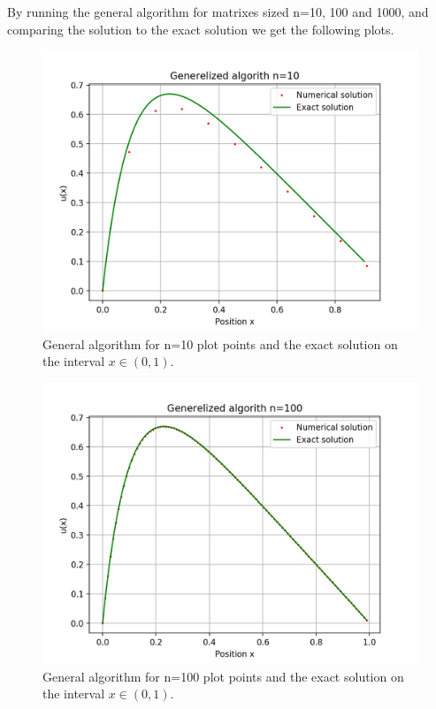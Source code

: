 \documentclass[10pt]{article}
\begin{document}
By running the general algorithm for matrixes sized n=10, 100 and 1000, and comparing the solution to the exact solution we get the following plots.

\begin{figure}[H]
  \center
  \includegraphics[scale=0.5]{alg-0-n10plot.png}
  \caption{General algorithm for n=10 plot points and the exact solution on the interval $x\in (0,1)$.}
\end{figure}
\begin{figure}[H]
  \center
  \includegraphics[scale=0.5]{alg-0-n100plot.png}  \caption{General algorithm for n=100 plot points and the exact solution on the interval $x\in (0,1)$.}
\end{figure}
\end{document}
